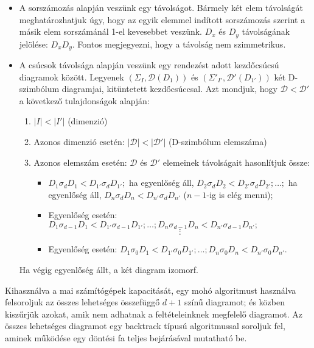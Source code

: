 \documentclass[12pt,magyar,a4paper]{article}
\begin{document}
\begin{itemize}
  \item A sorszámozás alapján veszünk egy távolságot. Bármely
    két elem távolságát meghatározhatjuk úgy, hogy az egyik elemmel indított
    sorszámozás szerint a másik elem sorszámánál 1-el kevesebbet veszünk.
    $D_x$ és $D_y$ távolságának jelölése: $D_xD_y$. Fontos megjegyezni, hogy a
    távolság nem szimmetrikus.
  \item A csúcsok távolsága alapján veszünk egy rendezést adott kezdőcsúcsú
    diagramok között. Legyenek $(\Sigma_I,\mathcal{D}(D_1))$ és
    $(\Sigma'_{I'},\mathcal{D}'(D_{1'}))$ két D-szimbólum diagramjai,
    kitüntetett kezdőcsúccsal. Azt mondjuk, hogy $\mathcal{D}<\mathcal{D}'$ a    
    következő tulajdonságok alapján:
    \begin{enumerate}
      \item $|I|<|I'|$ (dimenzió)
      \item Azonos dimenzió esetén: $|\mathcal{D}|<|\mathcal{D}'|$ (D-szimbólum elemszáma)
      \item Azonos elemszám esetén: $\mathcal{D}$ és $\mathcal{D}'$ elemeinek
	távolságait hasonlítjuk össze:
	\begin{itemize}
	  \item $D_1\sigma_d D_1<D_{1'}\sigma_d D_{1'};$ ha egyenlőség áll,
	    $D_2\sigma_d D_2<D_{2'}\sigma_d D_{2'};\ldots;$ ha egyenlőség áll,
	    $D_n\sigma_d D_n<D_{n'}\sigma_d D_{n'}$ ($n-1$-ig is elég menni);
	  \item Egyenlőség esetén: $D_1\sigma_{d-1} D_1<D_{1'}\sigma_{d-1} D_{1'};
	    \ldots;D_n\sigma_{d-1} D_n<D_{n'}\sigma_{d-1} D_{n'};$
	    \begin{equation*}
	      \vdots
	    \end{equation*}
	  \item Egyenlőség esetén: $D_1\sigma_0 D_1<D_{1'}\sigma_0 D_{1'};
	    \ldots;D_n\sigma_0 D_n<D_{n'}\sigma_0 D_{n'}.$
	\end{itemize}
    \end{enumerate}
    Ha végig egyenlőség állt, a két diagram izomorf.
\end{itemize}

Kihasználva a mai számítógépek kapacitását, egy mohó algoritmust használva
felsoroljuk az összes lehetséges összefüggő $d+1$ színű diagramot; és közben
kiszűrjük azokat, amik nem adhatnak a feltételeinknek megfelelő diagramot.
Az összes lehetséges diagramot egy backtrack típusú algoritmussal soroljuk
fel, aminek működése egy döntési fa teljes bejárásával mutatható be.
\end{document}
